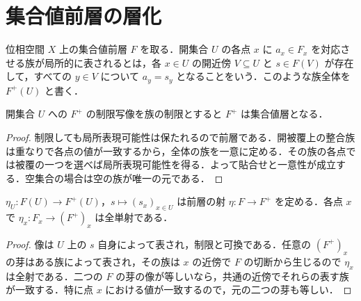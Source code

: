 \section{集合値前層の層化}
\begin{defn}[局所的に芽で表される族]
位相空間 $X$ 上の集合値前層 $F$ を取る．開集合 $U$ の各点 $x$ に $a_x\in F_x$ を対応させる族が局所的に表されるとは，各 $x\in U$ の開近傍 $V\subseteq U$ と $s\in F(V)$ が存在して，すべての $y\in V$ について $a_y=s_y$ となることをいう．このような族全体を $F^+(U)$ と書く．
\end{defn}
\begin{prop}[局所表現可能な族の層性]
開集合 $U$ への $F^+$ の制限写像を族の制限とすると $F^+$ は集合値層となる．
\end{prop}
\begin{proof}
制限しても局所表現可能性は保たれるので前層である．開被覆上の整合族は重なりで各点の値が一致するから，全体の族を一意に定める．その族の各点では被覆の一つを選べば局所表現可能性を得る．よって貼合せと一意性が成立する．空集合の場合は空の族が唯一の元である．
\end{proof}
\begin{prop}[前層から層への標準射]
$\eta_U:F(U)\to F^+(U)$，$s\mapsto(s_x)_{x\in U}$ は前層の射 $\eta:F\to F^+$ を定める．各点 $x$ で $\eta_x:F_x\to (F^+)_x$ は全単射である．
\end{prop}
\begin{proof}
像は $U$ 上の $s$ 自身によって表され，制限と可換である．任意の $(F^+)_x$ の芽はある族によって表され，その族は $x$ の近傍で $F$ の切断から生じるので $\eta_x$ は全射である．二つの $F$ の芽の像が等しいなら，共通の近傍でそれらの表す族が一致する．特に点 $x$ における値が一致するので，元の二つの芽も等しい．
\end{proof}
